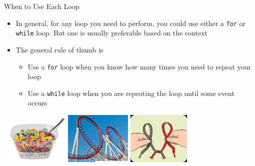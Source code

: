 {}\documentclass[letterpaper,
compress,
xcolor=x11names,
]{beamer}
\begin{document}

\begin{frame}{When to Use Each Loop}
	\footnotesize
	\begin{itemize}
		\item In general, for any loop you need to perform, you could use either a \texttt{for} or \texttt{while} loop. But one is usually preferable based on the context
		\item The general rule of thumb is
		\begin{itemize}
			\item<2-> Use a \texttt{for} loop when you know how many times you need to repeat your loop 
			\item<3-> Use a \texttt{while} loop when you are repeating the loop until some event occurs
		\end{itemize}
	\end{itemize}
	\begin{center}
		\includegraphics[height = 2.5cm]{Cereal_loops.jpg}
		\includegraphics[height = 2.5cm]{Coaster_loops.jpg}
		\includegraphics[height = 2.5cm]{shoe_loops.png}
	\end{center}
\end{frame}

\end{document}
